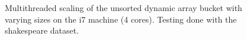 \begin{landscape}
\begin{figure}[H]
{    }
    \label{fig:ts_i7_shake_unsorted}
    \caption{Multithreaded scaling of the unsorted dynamic array bucket with varying sizes on the
    i7 machine (4 cores). Testing done with the shakespeare dataset.}
\end{figure}
\begin{figure}[H]
\end{figure}
\end{landscape}
